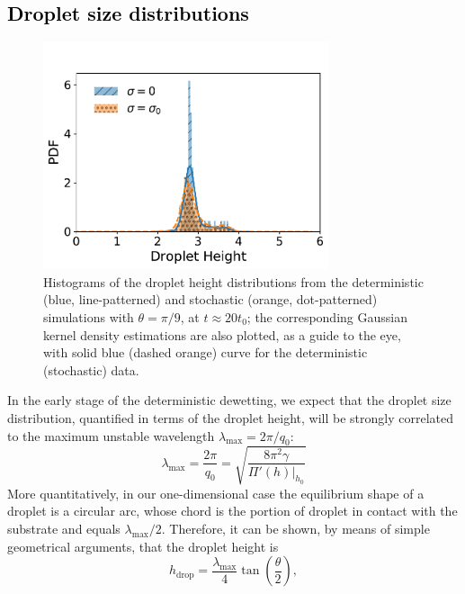 \subsection{\textcolor{black}{Droplet size distributions}}\label{subsec:morphandrup}
\begin{figure}
    \centering
    \includegraphics[width=0.75\textwidth]{graphics/Droplet_height_['00', '1e-7']_distri_new_35_nodist.pdf}
    \caption{Histograms of the droplet height distributions from the deterministic (blue, line-patterned) and stochastic (orange, dot-patterned) simulations with 
    $\theta = \pi/9$, at $t \approx 20 t_0$; the corresponding Gaussian kernel density estimations are also plotted, as a guide to the eye, with solid blue (dashed orange) curve for the deterministic (stochastic) data.
    }
    \label{fig:droplet_distribution}
\end{figure}
In the early stage of the deterministic dewetting, we expect that 
the droplet size distribution, quantified in 
terms of the droplet height, will be strongly correlated to the maximum unstable wavelength 
$\lambda_{\text{max}} =2\pi/q_0$:
\begin{equation}\label{eq:lambda_max}
    \lambda_{\text{max}} = \frac{2\pi}{q_0} = \sqrt{\frac{8\pi^2\gamma}{\Pi'(h)|_{h_0}}} 
\end{equation}
More quantitatively, in our one-dimensional case the equilibrium shape of a droplet is a circular arc, 
whose chord is the portion of droplet in contact with the substrate and equals $\lambda_{\text{max}}/2$. Therefore, it can be 
shown, by means of simple geometrical arguments, that the droplet height is
\begin{equation}\label{eq:cap_height}
   h_{\text{drop}} = \frac{\lambda_{\text{max}}}{4}\tan\left(\frac{\theta}{2}\right), 
\end{equation}
